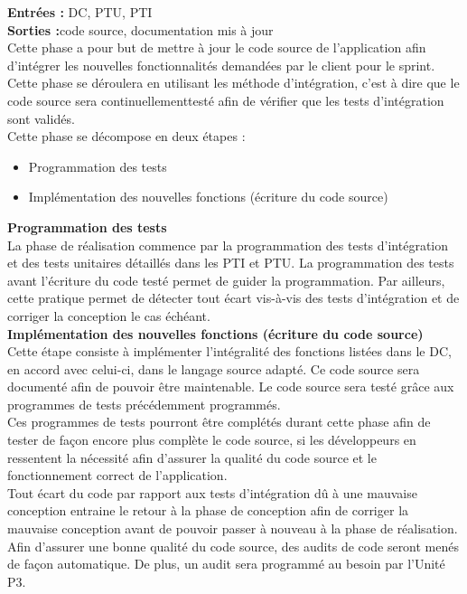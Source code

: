 \textbf{Entrées :} DC, PTU, PTI \\
\textbf{Sorties :}code source, documentation mis à jour \\
Cette phase a pour but de mettre à jour le code source de l’application afin d’intégrer les nouvelles fonctionnalités demandées par le client pour le sprint. Cette phase se déroulera en utilisant les méthode d’intégration, c’est à dire que le code source sera continuellementtesté afin de vérifier que les tests d’intégration sont validés.\\ 
Cette phase se décompose en deux étapes :
\begin{itemize}
\item Programmation des tests
\item Implémentation des nouvelles fonctions (écriture du code source)
\end{itemize}

\textbf{Programmation des tests} \\

La phase de réalisation commence par la programmation des tests d’intégration et des tests unitaires détaillés dans les PTI et PTU. 
La programmation des tests avant l’écriture du code testé permet de guider la programmation. 
Par ailleurs, cette pratique permet de détecter tout écart vis-à-vis des tests d’intégration et de corriger la conception le cas échéant.\\

\textbf{Implémentation des nouvelles fonctions (écriture du code source)} \\

Cette étape consiste à implémenter l’intégralité des fonctions listées dans le DC, en accord avec celui-ci, dans le langage source adapté. Ce code source sera documenté afin de pouvoir être maintenable.
Le code source sera testé grâce aux programmes de tests précédemment programmés.\\
Ces programmes de tests pourront être complétés durant cette phase afin de tester de façon encore plus complète le code source, si les développeurs en ressentent la nécessité afin d’assurer la qualité du code source et le fonctionnement correct de l’application. \\
Tout écart du code par rapport aux tests d’intégration dû à une mauvaise conception entraine le retour à la phase de conception afin de corriger la mauvaise conception avant de pouvoir passer à nouveau à la phase de réalisation.
Afin d’assurer une bonne qualité du code source, des audits de code seront menés de façon automatique. De plus, un audit sera programmé au besoin par l’Unité P3.


